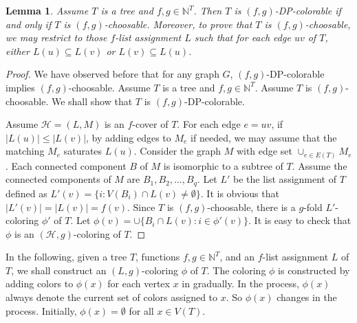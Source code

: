 \documentclass{article}
\newtheorem{lemma}{Lemma}
\begin{document}
\begin{lemma}
    \label{lem-choosable}
    Assume $T$ is a tree and $f,g \in \mathbb{N}^T$. Then $T$ is $(f,g)$-DP-colorable if and only if $T$ is $(f,g)$-choosable. Moreover, to prove that $T$ is $(f,g)$-choosable, we may restrict to those $f$-list assignment $L$ such that for each edge $uv$ of $T$, either $L(u) \subseteq L(v)$ or $L(v) \subseteq L(u)$.
\end{lemma}
\begin{proof}
    We have observed before that for any graph $G$, $(f,g)$-DP-colorable  implies $(f,g)$-choosable. Assume $T$ is a tree and $f,g \in \mathbb{N}^T$. Assume $T$ is $(f,g)$-choosable. We shall show that $T$ is $(f,g)$-DP-colorable.
 
    Assume $\mathcal{H}=(L,M)$ is an $f$-cover of $T$. For each edge $e=uv$, if $|L(u)| \le |L(v)|$, by adding edges to $M_e$ if needed, we may assume that the matching $M_e$ saturates $L(u)$. Consider the graph $M$ with edge set $\cup_{e \in E(T)}M_e$. Each connected component $B$ of $M$ is isomorphic to a subtree of $T$. Assume the connected components of $M$ are $B_1,B_2, \ldots, B_q$. Let $L'$ be the list assignment of $T$ defined as $L'(v) = \{i: V(B_i) \cap L(v) \ne \emptyset\}$. It is obvious that $|L'(v)|=|L(v)| = f(v)$. Since $T$ is $(f,g)$-choosable, there is a $g$-fold $L'$-coloring $\phi'$ of $T$. Let $\phi(v) = \cup \{B_i \cap L(v): i \in \phi'(v)\}$. It is easy to check that $\phi$ is an $(\mathcal{H}, g)$-coloring of $T$. 
\end{proof}


In the following, given a tree $T$, functions $f,g \in \mathbb{N}^T$, and an $f$-list assignment $L$ of $T$, we shall construct an $(L,g)$-coloring $\phi$ of $T$. The coloring $\phi$ is constructed by adding colors to $\phi(x)$ for each vertex $x$ in gradually. In the process, $\phi(x)$ always denote the current set of colors assigned to $x$. So $\phi(x)$ changes in the process.  Initially, $\phi(x)= \emptyset$ for all $x \in V(T)$. 
\end{document}
